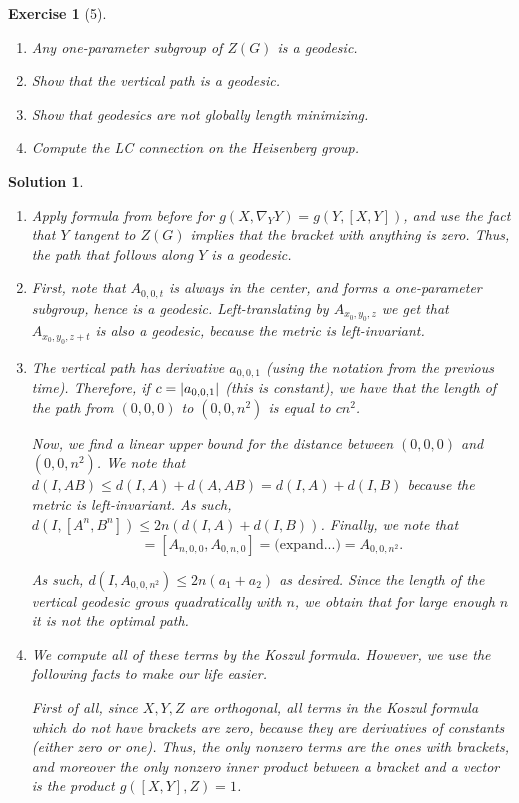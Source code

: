 \documentclass{article}
\theoremstyle{plain}
\newtheorem*{ex}{Exercise}
\theoremstyle{nonumberplain}
\newtheorem{sol}{Solution}
\DeclarePairedDelimiter{\abs}{\lvert}{\rvert}
\begin{document}
\begin{ex}[5]
\leavevmode
\begin{enumerate}
\item Any one-parameter subgroup of $Z(G)$ is a geodesic.
\item Show that the vertical path is a geodesic.
\item Show that geodesics are not globally length minimizing.
\item Compute the LC connection on the Heisenberg group.
\end{enumerate}
\end{ex}

\begin{sol}
\leavevmode
\begin{enumerate}
\item Apply formula from before for $g(X,\nabla_Y Y) = g(Y, [X,Y])$, and use the fact that $Y$ tangent to $Z(G)$ implies that the bracket with anything is zero. Thus, the path that follows along $Y$ is a geodesic.
\item First, note that $A_{0,0,t}$ is always in the center, and forms a one-parameter subgroup, hence is a geodesic. Left-translating by $A_{x_0, y_0, z}$ we get that $A_{x_0, y_0, z+t}$ is also a geodesic, because the metric is left-invariant.
\item The vertical path has derivative $a_{0,0,1}$ (using the notation from the previous time). Therefore, if $c = \abs{a_{0,0,1}}$ (this is constant), we have that the length of the path from $(0,0,0)$ to $(0,0,n^2)$ is equal to $c n^2$.

Now, we find a linear upper bound for the distance between $(0,0,0)$ and $(0,0,n^2)$. We note that $d(I, AB) \leq d(I, A) + d(A, AB) = d(I,A) + d(I,B)$ because the metric is left-invariant. As such, $d(I,[A^n,B^n]) \leq 2 n (d(I,A) + d(I,B))$. Finally, we note that
\begin{equation}
[A_{1,0,0}^n, A_{0,1,0}^n] = [A_{n,0,0}, A_{0,n,0}] = \text{(expand...)} = A_{0,0,n^2}.
\end{equation}

As such, $d(I, A_{0,0,n^2}) \leq 2 n (a_1 + a_2)$ as desired. Since the length of the vertical geodesic grows quadratically with $n$, we obtain that for large enough $n$ it is \emph{not} the optimal path.

\item We compute all of these terms by the Koszul formula. However, we use the following facts to make our life easier.

First of all, since $X,Y,Z$ are orthogonal, all terms in the Koszul formula which do not have brackets are zero, because they are derivatives of constants (either zero or one). Thus, the only nonzero terms are the ones with brackets, and moreover the only nonzero inner product between a bracket and a vector is the product $g([X,Y],Z) = 1$.


\end{enumerate}
\end{sol}
\end{document}
